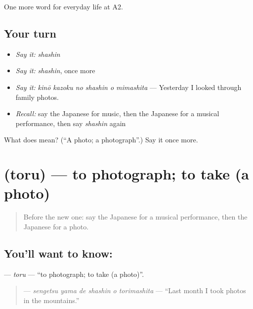 \begin{grammarlens}[title={What you've built}]
One more word for everyday life at A2.
\end{grammarlens}

\subsection*{Your turn}
\begin{itemize}
\raggedright
  \item \emph{Say it:} \emph{shashin}
  \item \emph{Say it:} \emph{shashin}, once more
  \item \emph{Say it:} \emph{kinō kazoku no shashin o mimashita} — Yesterday I looked through family photos.
  \item \emph{Recall:} say the Japanese for music, then the Japanese for a musical performance, then say \emph{shashin} again
\end{itemize}

\begin{tcolorbox}[breakable,colback=teal!4,colframe=teal!35!black,title={Before you move on}]
What does  mean? (\textquotedblleft{}A photo; a photograph\textquotedblright{}.) Say it once more.
\end{tcolorbox}
\section[\texorpdfstring{\ja{とる} (toru)}{とる (toru)}]{ (toru) — to photograph; to take (a photo)}

\label{lesson:JA-C237-toru}



\begin{quote}
Before the new one: say the Japanese for a musical performance, then the Japanese for a photo.
\end{quote}

\subsection*{You'll want to know: }
\textbf{} — \emph{toru} — \textquotedblleft{}to photograph; to take (a photo)\textquotedblright{}.

\begin{quote}
\textbf{   } — \emph{sengetsu yama de shashin o torimashita} — \textquotedblleft{}Last month I took photos in the mountains.\textquotedblright{}
\end{quote}

